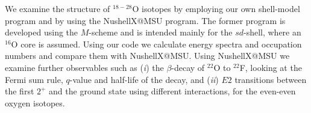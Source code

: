 We examine the structure of $ ^{18-28} $O isotopes by employing our own shell-model program and by using the NushellX@MSU program. The former program is developed using the $ M $-scheme and is intended mainly for the $ sd $-shell, where an $ ^{16} $O core is assumed. Using our code we calculate energy spectra and occupation numbers and compare them with NushellX@MSU. Using NushellX@MSU we examine further observables such as (\textit{i}) the $ \beta $-decay of $ ^{22} $O to $ ^{22} $F, looking at the Fermi sum rule, $ q $-value and half-life of the decay, and (\textit{ii}) $ E2 $ transitions between the first $ 2^+ $ and the ground state using different interactions, for the even-even oxygen isotopes.